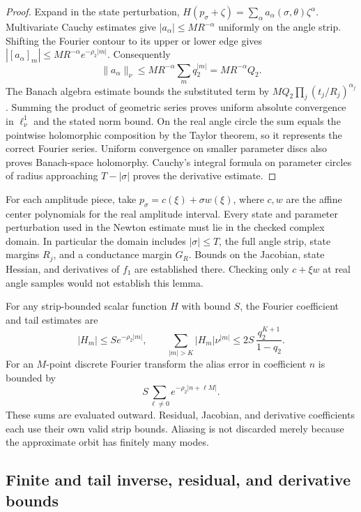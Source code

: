 \documentclass[11pt]{article}
\theoremstyle{definition}
\begin{document}
\begin{proof} Expand in the state perturbation,
$H(p_\sigma+\zeta)=\sum_\alpha a_\alpha(\sigma,\theta)\zeta^\alpha$.
Multivariate Cauchy estimates give
$|a_\alpha|\le M R^{-\alpha}$ uniformly on the angle strip. Shifting the Fourier contour to its upper or lower edge gives
$|[a_\alpha]_m|\le M R^{-\alpha}e^{-\rho_2|m|}$.
Consequently
\[
 \|a_\alpha\|_\nu\le M R^{-\alpha}
                  \sum_m q_2^{|m|}
              =M R^{-\alpha}Q_2.
\]
The Banach algebra estimate bounds the substituted term by
$M Q_2\prod_j(t_j/R_j)^{\alpha_j}$.
Summing the product of geometric series proves uniform absolute convergence in $\ell^1_\nu$ and the stated norm bound. On the real angle circle the sum equals the pointwise holomorphic composition by the Taylor theorem, so it represents the correct Fourier series. Uniform convergence on smaller parameter discs also proves Banach-space holomorphy. Cauchy's integral formula on parameter circles of radius approaching $T-|\sigma|$ proves the derivative estimate.

\end{proof}

For each amplitude piece, take
$p_\sigma=c(\xi)+\sigma w(\xi)$, where $c,w$ are the affine center polynomials for the real amplitude interval. Every state and parameter perturbation used in the Newton estimate must lie in the checked complex domain. In particular the domain includes $|\sigma|\le T$, the full angle strip, state margins $R_j$, and a conductance margin $G_R$. Bounds on the Jacobian, state Hessian, and derivatives of $f_1$ are established there. Checking only $c+\xi w$ at real angle samples would not establish this lemma.

For any strip-bounded scalar function $H$ with bound $S$, the Fourier coefficient and tail estimates are
\[
 |H_m|\le S e^{-\rho_2|m|},\qquad
 \sum_{|m|>K}|H_m|\nu^{|m|}
 \le 2S\,\frac{q_2^{K+1}}{1-q_2}.
\]
For an $M$-point discrete Fourier transform the alias error in coefficient $n$ is bounded by
\[
 S\sum_{\ell\ne0}e^{-\rho_2|n+\ell M|}.
\]
These sums are evaluated outward. Residual, Jacobian, and derivative coefficients each use their own valid strip bounds. Aliasing is not discarded merely because the approximate orbit has finitely many modes.

\subsection{Finite and tail inverse, residual, and derivative bounds}\label{sec:ha-7}
\end{document}
